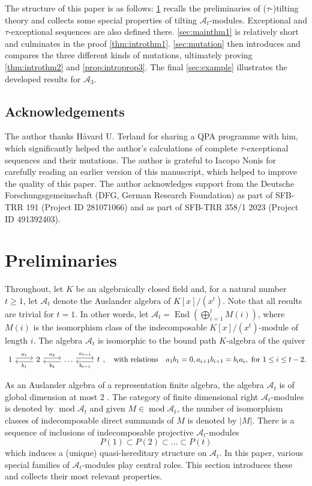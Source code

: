 \documentclass[10pt,twoside, a4paper,reqno]{amsart}
\DeclareMathOperator{\mods}{mod}
\DeclareMathOperator{\End}{End}
\newcommand{\A}{\mathscr{A}}
\theoremstyle{definition}
\begin{document}
The structure of this paper is as follows: \cref{sec:prelim} recalls the preliminaries of ($\tau$-)tilting theory and collects some special properties of tilting $\A_t$-modules. Exceptional and $\tau$-exceptional sequences are also defined there. \cref{sec:mainthm1} is relatively short and culminates in the proof \cref{thm:introthm1}. \cref{sec:mutation} then introduces and compares the three different kinds of mutations, ultimately proving \cref{thm:introthm2} and \cref{prop:introprop3}. The final \cref{sec:example} illustrates the developed results for $\A_3$. 

\subsection*{Acknowledgements}
The author thanks Håvard U. Terland for sharing a QPA programme with him, which significantly helped the author's calculations of complete $\tau$-exceptional sequences and their mutations. The author is grateful to Iacopo Nonis for carefully reading an earlier version of this manuscript, which helped to improve the quality of this paper. The author acknowledges support from the Deutsche Forschungsgemeinschaft (DFG, German Research Foundation) as part of SFB-TRR 191 (Project ID 281071066) and as part of SFB-TRR 358/1 2023 (Project ID 491392403).


\section{Preliminaries}\label{sec:prelim}
Throughout, let $K$ be an algebraically closed field and, for a natural number $t \geq 1$, let $\A_t$ denote the Auslander algebra of $K[x]/(x^t)$. Note that all results are trivial for $t=1$. In other words, let $\A_t = \End(\bigoplus_{i=1}^t M(i))$, where $M(i)$ is the isomorphism class of the indecomposable $K[x]/(x^t)$-module of length $i$. The algebra $\A_t$ is isomorphic to the bound path $K$-algebra of the quiver
\[ \begin{tikzcd}
    1 \arrow[r, "a_1", shift left] & 2 \arrow[r, "a_2", shift left] \arrow[l, "b_1", shift left] & \dots \arrow[r, "a_{t-1}", shift left] \arrow[l, "b_2", shift left] & t \arrow[l,"b_{t-1}", shift left]
\end{tikzcd}, \quad \text{with relations}\quad  a_1 b_1= 0, a_{i+1}b_{i+1}= b_i a_i, \text{ for } 1 \leq i \leq t-2.\]

As an Auslander algebra of a representation finite algebra, the algebra $\A_t$ is of global dimension at most 2 \cite[Thm. 4.6]{Auslander1974b}. The category of finite dimensional right $\A_t$-modules is denoted by $\mods \A_t$ and given $M \in \mods \A_t$, the number of isomorphism classes of indecomposable direct summands of $M$ is denoted by $|M|$. There is a sequence of inclusions of indecomposable projective $\A_t$-modules
\[ P(1) \subset P(2) \subset \dots \subset P(t) \] 
which induces a (unique) quasi-hereditary structure on $\A_t$. In this paper, various special families of $\A_t$-modules play central roles. This section introduces these and collects their most relevant properties.
\end{document}
